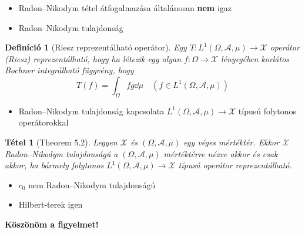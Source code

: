 \documentclass{beamer} %
\newtheorem{theo}[lem]{Tétel}
\newtheorem{defi}[lem]{Definíció}
\begin{document}
\begin{frame}
\justifying
\begin{itemize}
\item Radon\---Nikodym tétel átfogalmazása általánosan \textbf{nem} igaz
\pause \item Radon\---Nikodym tulajdonság
\end{itemize}
\pause \begin{defi}[Riesz reprezentálható operátor] Egy $T \colon L^1(\Omega, \mathcal{A}, \mu) \to \mathcal{X}$ operátor (Riesz) reprezentálható, hogy ha létezik egy olyan $f\colon \Omega \to \mathcal{X}$ lényegében korlátos Bochner integrálható függvény, hogy
$$T(f) = \int_{\Omega} fg \dd{\mu} \quad(f \in L^1(\Omega, \mathcal{A}, \mu))$$
\end{defi}
\begin{itemize}
\pause \item Radon\---Nikodym tulajdonság kapcsolata $L^1(\Omega, \mathcal{A}, \mu) \to \mathcal{X}$ típusú folytonos operátorokkal
\end{itemize}
\end{frame}
\begin{frame}
\justifying
\begin{theo}[Theorem 5.2] Legyen $\mathcal{X}$ és $(\Omega, \mathcal{A}, \mu)$ egy véges mértéktér. Ekkor $\mathcal{X}$ Radon\---Nikodym tulajdonságú a $(\Omega, \mathcal{A}, \mu)$ mértéktérre nézve akkor és csak akkor, ha bármely folytonos $L^1(\Omega, \mathcal{A}, \mu) \to \mathcal{X}$ típusú operátor reprezentálható.
\end{theo}
\begin{itemize}
\pause \item $c_0$ nem Radon\---Nikodym tulajdonságú
\pause \item Hilbert-terek igen
\end{itemize}
\end{frame}
\begin{frame}
\center
\textbf{Köszönöm a figyelmet!}
\end{frame}
\end{document}
